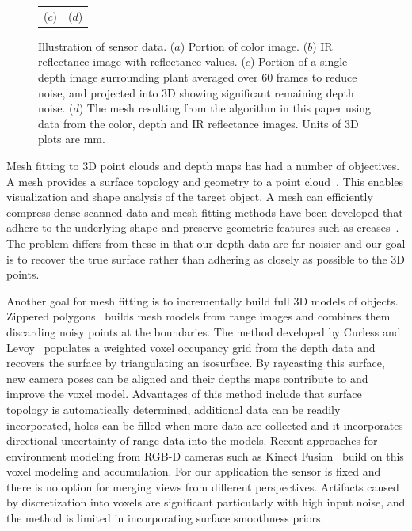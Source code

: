 \begin{figure}
\begin{center}
\begin{tabular}{ c c }
($c$) & ($d$) \\
\end{tabular}
\end{center}
\caption{Illustration of sensor data.  ($a$) Portion of color image. ($b$) IR reflectance image with reflectance values. ($c$) Portion of a single depth image surrounding plant averaged over 60 frames to reduce noise, and projected into $3$D showing significant remaining depth noise. ($d$)  The mesh resulting from the algorithm in this paper using data from the color, depth and IR reflectance images.  Units of $3$D plots are mm.  }
\label{fig:plantnoise}
\end{figure}



Mesh fitting to $3$D point clouds and depth maps has had a number of objectives.  A mesh provides a surface topology and geometry to a point cloud~\cite{Sienz2000,Yeh2011}.  This enables visualization and shape analysis of the target object.  A mesh can efficiently compress dense scanned data and mesh fitting methods have been developed that adhere to the underlying shape and preserve geometric features such as creases~\cite{hoppe:1994,Kobbelt:1998}.  The problem differs from these in that our depth data are far noisier and our goal is to recover the true surface rather than adhering as closely as possible to the 3D points.

Another goal for mesh fitting is to incrementally build full $3$D models of objects.  Zippered polygons~\cite{Turk1994} builds mesh models from range images and combines them discarding noisy points at the boundaries.  The method developed by Curless and Levoy~\cite{Curless:1996} populates a weighted voxel occupancy grid from the depth data and recovers the surface by triangulating an isosurface.  By raycasting this surface, new camera poses can be aligned and their depths maps contribute to and improve the voxel model.  Advantages of this method include that surface topology is automatically determined, additional data can be readily incorporated, holes can be filled when more data are collected and it incorporates directional uncertainty of range data into the models.  Recent approaches for environment modeling from RGB-D cameras such as Kinect Fusion~\cite{Izadi:2011,Newcombe:2011} build on this voxel modeling and accumulation.  For our application the sensor is fixed and there is no option for merging views from different perspectives.  Artifacts caused by discretization into voxels are significant particularly with high input noise, and the method is limited in incorporating surface smoothness priors.

